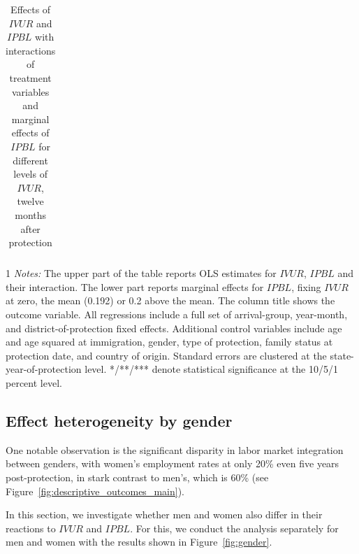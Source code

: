 \begin{table}
	\caption{Effects of $IVUR$ and $IPBL$ with interactions of treatment variables and marginal effects of $IPBL$ for different levels of $IVUR$, twelve months after protection}
	\label{tab:interactions}
	\begin{threeparttable}
		\begin{small}
			\begin{tabular}{lcccc}				
			\end{tabular}
		\end{small}
		\begin{tablenotes} 
			\begin{footnotesize}
				\begin{spacing}{1}
					\textit{Notes:} The upper part of the table reports OLS estimates for $IVUR$, $IPBL$ and their interaction. The lower part reports marginal effects for $IPBL$, fixing $IVUR$ at zero, the mean (0.192) or 0.2 above the mean. The column title shows the outcome variable. All regressions include a full set of arrival-group, year-month, and district-of-protection fixed effects. Additional control variables include age and age squared at immigration, gender, type of protection, family status at protection date, and country of origin. Standard errors are clustered at the state-year-of-protection level. */**/*** denote statistical significance at the 10/5/1 percent level.
				\end{spacing}
			\end{footnotesize}
		\end{tablenotes}
	\end{threeparttable}
\end{table}


\FloatBarrier

\subsection{Effect heterogeneity by gender}

One notable observation is the significant disparity in labor market integration between genders, with women's employment rates at only 20\% even five years post-protection, in stark contrast to men's, which is 60\% (see Figure~\ref{fig:descriptive_outcomes_main}).

In this section, we investigate whether men and women also differ in their reactions to $IVUR$ and $IPBL$.  For this, we conduct the analysis separately for men and women with the results shown in Figure~\ref{fig:gender}. 

